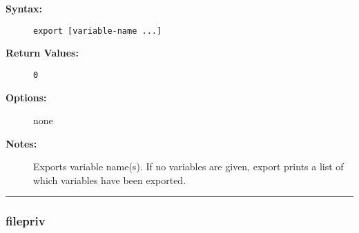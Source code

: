 \begin{description}
\item[{\bf Syntax:}] \mbox{}

{\tt export [variable-name ...]}

\item[{\bf Return Values:}] \mbox{}

\begin{description}
\item[{\tt 0}] \mbox{}



\end{description}


\item[{\bf Options:}] \mbox{}

none  

\item[{\bf Notes:}] \mbox{}

Exports variable name(s). If no variables are given, 
export prints a list of which variables have been exported.

\end{description}


\hrule
\subsubsection{filepriv}

